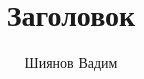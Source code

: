 \documentclass{article}
\begin{document}
\title{Заголовок}
\author{Шиянов Вадим}
\maketitle
\end{document}
